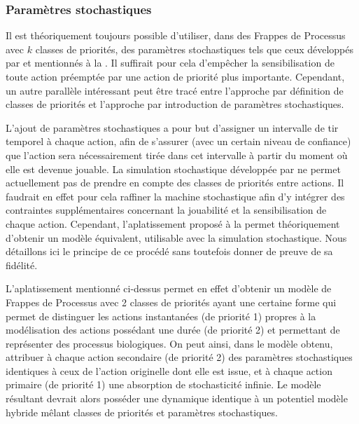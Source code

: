 \subsubsection{Paramètres stochastiques}

Il est théoriquement toujours possible d'utiliser,
dans des Frappes de Processus avec $k$ classes de priorités,
des paramètres stochastiques tels que ceux
développés par  et mentionnés à la .
Il suffirait pour cela d'empêcher la sensibilisation de toute action préemptée par une action
de priorité plus importante.
Cependant, un autre parallèle intéressant peut être tracé entre l'approche
par définition de classes de priorités
et l'approche par introduction de paramètres stochastiques.

\myskip

L'ajout de paramètres stochastiques a pour but d'assigner un intervalle de tir temporel à
chaque action, afin de s'assurer (avec un certain niveau de confiance) que l'action sera
nécessairement tirée dans cet intervalle à partir du moment où elle est devenue jouable.
La simulation stochastique développée par 
ne permet actuellement pas de prendre en compte des classes de priorités entre actions.
Il faudrait en effet pour cela raffiner la machine stochastique afin d'y intégrer des contraintes
supplémentaires concernant la jouabilité et la sensibilisation de chaque action.
Cependant, l'aplatissement proposé à la 
permet théoriquement d'obtenir un modèle équivalent,
utilisable avec la simulation stochastique.
Nous détaillons ici le principe de ce procédé sans toutefois donner de preuve de sa fidélité.

L'aplatissement mentionné ci-dessus permet en effet d'obtenir un modèle de Frappes de Processus
avec 2 classes de priorités ayant une certaine forme qui permet de distinguer
les actions instantanées (de priorité 1) propres à la modélisation
des actions possédant une durée (de priorité 2) et permettant de représenter des processus
biologiques.
On peut ainsi, dans le modèle obtenu, attribuer à chaque action secondaire (\cad de priorité 2)
des paramètres stochastiques identiques à ceux de l'action originelle dont elle est issue,
et à chaque action primaire (\cad de priorité 1) une absorption de stochasticité infinie.
Le modèle résultant devrait alors posséder une dynamique identique à un potentiel modèle hybride
mêlant classes de priorités et paramètres stochastiques.

